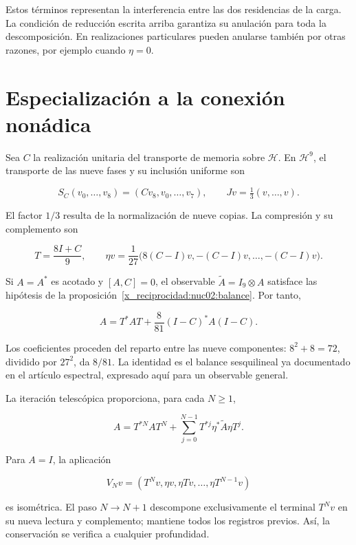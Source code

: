 Estos términos representan la interferencia entre las dos residencias de la carga. La condición de reducción escrita arriba garantiza su anulación para toda la descomposición. En realizaciones particulares pueden anularse también por otras razones, por ejemplo cuando \(\eta=0\).

\section{Especialización a la conexión nonádica}

Sea \(C\) la realización unitaria del transporte de memoria sobre \(\mathcal H\). En \(\mathcal H^9\), el transporte de las nueve fases y su inclusión uniforme son

\[
S_C(v_0,\ldots,v_8)=(Cv_8,v_0,\ldots,v_7),
\qquad Jv=\tfrac13(v,\ldots,v).
\]

El factor \(1/3\) resulta de la normalización de nueve copias. La compresión y su complemento son

\[
T=\frac{8I+C}{9},\qquad
\eta v=\frac1{27}\bigl(8(C-I)v,-(C-I)v,\ldots,-(C-I)v\bigr).
\]

Si \(A=A^*\) es acotado y \([A,C]=0\), el observable \(\widetilde A=I_9\otimes A\) satisface las hipótesis de la proposición~\ref{x_reciprocidad:nuc02:balance}. Por tanto,

\begin{equation}
\boxed{A=T^*AT+\frac8{81}(I-C)^*A(I-C).}\label{x_reciprocidad:nuc02:eq:2}
\end{equation}

Los coeficientes proceden del reparto entre las nueve componentes: \(8^2+8=72\), dividido por \(27^2\), da \(8/81\). La identidad es el balance sesquilineal ya documentado en el artículo espectral, expresado aquí para un observable general.

La iteración telescópica proporciona, para cada \(N\geq1\),

\begin{equation}
A=T^{*N}AT^N+
\sum_{j=0}^{N-1}T^{*j}\eta^*\widetilde A\eta T^j.\label{x_reciprocidad:nuc02:eq:3}
\end{equation}

Para \(A=I\), la aplicación

\[
V_Nv=(T^Nv,\eta v,\eta Tv,\ldots,\eta T^{N-1}v)
\]

es isométrica. El paso \(N\to N+1\) descompone exclusivamente el terminal \(T^Nv\) en su nueva lectura y complemento; mantiene todos los registros previos. Así, la conservación se verifica a cualquier profundidad.

